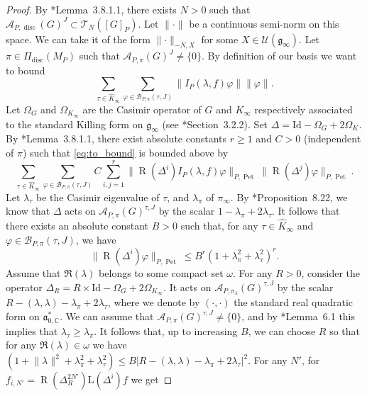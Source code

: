 \documentclass[letterpaper,11pt]{amsart}
\newcommand{\fa}{\mathfrak{a}}
\newcommand{\fg}{\mathfrak{g}}
\newcommand{\C}{\mathbb{C}}
\newcommand{\cA}{\mathcal{A}}
\newcommand{\cB}{\mathcal{B}}
\newcommand{\cT}{\mathcal{T}}
\newcommand{\cU}{\mathcal{U}}
\newcommand{\<}{\negthickspace}
\providecommand{\aabs}[1]{\lVert#1\rVert}
\newcommand{\valP}[1]{\left|#1\right|}
\DeclareMathOperator{\rR}{R}
\DeclareMathOperator{\disc}{disc}
\DeclareMathOperator{\Pet}{Pet}
\theoremstyle{definition}
\theoremstyle{plain}
\theoremstyle{remark}
\numberwithin{equation}{section}
\begin{document}
    \begin{proof}
        By \cite{Ch}*{Lemma~3.8.1.1}, there exists $N>0$ such that $\cA_{P,\disc}(G)^J \subset \cT_N([G]_P)$. Let $\aabs{\cdot}$ be a continuous semi-norm on this space. We can take it of the form $\aabs{\cdot}_{-N,X}$ for some $X \in \cU(\fg_\infty)$. Let $\pi \in \Pi_{\disc}(M_P)$ such that $\cA_{P,\pi}(G)^J \neq \{0\}$. By definition of our basis we want to bound 
        \begin{equation}
            \label{eq:to_bound}
            \sum_{\tau \in \widehat{K}_\infty} \sum_{\varphi \in \cB_{P, \pi}(\tau,J)} \aabs{I_P(\lambda,f)\varphi}\aabs{\varphi}.
        \end{equation}
        Let $\Omega_G$ and $\Omega_{K_\infty}$ are the Casimir operator of $G$ and $K_\infty$ respectively associated to the standard Killing form on $\fg_\infty$ (see \cite{Ch}*{Section~3.2.2}). Set $\Delta=\mathrm{Id}-\Omega_G+2\Omega_K$. 
        By \cite{Ch}*{Lemma~3.8.1.1}, there exist absolute constants $r \geq 1$ and $C>0$ (independent of $\pi$) such that \eqref{eq:to_bound} is bounded above by
        \begin{equation*}
            \sum_{\tau \in \widehat{K}_\infty} \sum_{\varphi \in \cB_{P, \pi}(\tau,J)} C\sum_{i,j=1}^r \aabs{\rR(\Delta^i)I_P(\lambda,f)\varphi}_{P,\Pet}\aabs{\rR(\Delta^j)\varphi}_{P,\Pet}.
        \end{equation*}
        Let $\lambda_\tau$ be the Casimir eigenvalue of $\tau$, and $\lambda_\pi$ of $\pi_\infty$. By \cite{Kn}*{Proposition~8.22}, we know that $\Delta$ acts on $\cA_{P,\pi}(G)^{\tau,J}$ by the scalar $1-\lambda_\pi+2\lambda_\tau$. It follows that there exists an absolute constant $B>0$ such that, for any $\tau \in \widehat{K}_\infty$ and $\varphi \in \cB_{P, \pi}(\tau,J)$, we have 
        \begin{equation*}
            \aabs{\rR(\Delta^i)\varphi}_{P,\Pet}\leq B^r(1+\lambda_\pi^2+\lambda_\tau^2)^r.
        \end{equation*}
        Assume that $\Re(\lambda)$ belongs to some compact set $\omega$. For any $R>0$, consider the operator $\Delta_R=R \times \mathrm{Id}-\Omega_G+2\Omega_{K_\infty}$. It acts on $\cA_{P,\pi_\lambda}(G)^{\tau,J}$ by the scalar $R-(\lambda,\lambda)-\lambda_\pi+2\lambda_\tau$, where we denote by $(\cdot,\cdot)$ the standard real quadratic form on $\fa_{0,\C}^*$. We can assume that $\cA_{P,\pi}(G)^{\tau,J} \neq \{0\}$, and by \cite{Mu2}*{Lemma~6.1} this implies that $\lambda_\tau \geq \lambda_\pi$. It follows that, up to increasing $B$, we can choose $R$ so that for any $\Re(\lambda) \in \omega$ we have $(1+\aabs{\lambda}^2+\lambda_\pi^2 + \lambda_\tau^2) \leq B\valP{R-(\lambda,\lambda)-\lambda_\pi+2\lambda_\tau}^2$. For any $N'$, for $f_{i,N'}=\rR(\Delta_R^{2N'})\mathrm{L}(\Delta^i)f$ we get

\end{proof}
\end{document}
